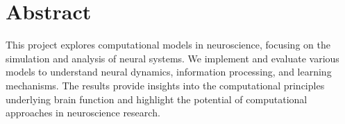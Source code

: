 \section*{Abstract}

This project explores computational models in neuroscience, focusing on the simulation and analysis of neural systems. We implement and evaluate various models to understand neural dynamics, information processing, and learning mechanisms. The results provide insights into the computational principles underlying brain function and highlight the potential of computational approaches in neuroscience research.